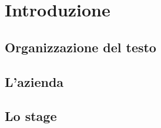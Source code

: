 \chapter{Introduzione}
\label{chap:introduzione}

\section{Organizzazione del testo}

\section{L'azienda}

\section{Lo stage}

\newpage